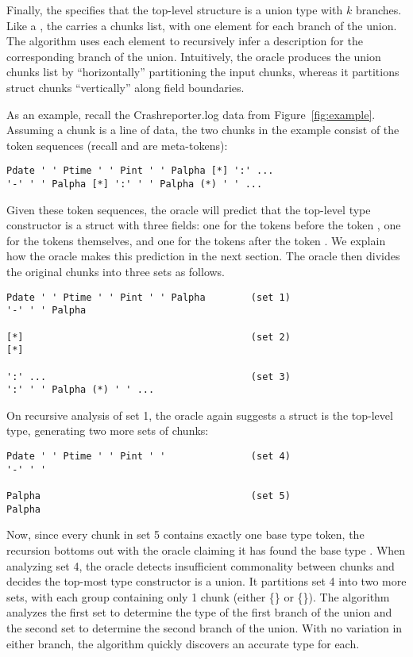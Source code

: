Finally, the  specifies that the top-level structure
is a union type with $k$ branches.  Like a , the
 carries a chunks list, with one element for each
branch of the union.  The algorithm uses each element to recursively
infer a description for the corresponding branch of the union. 
Intuitively, the oracle produces the union chunks list by ``horizontally''
partitioning the input chunks, whereas it partitions struct chunks
``vertically'' along field boundaries. 

As an example, recall the Crashreporter.log data from
Figure~\ref{fig:example}.  Assuming a chunk is a line of data, the two
chunks in the example consist of the token sequences
(recall \cd{[*]} and \cd{(*)} are meta-tokens):

{\small
\begin{verbatim}
Pdate ' ' Ptime ' ' Pint ' ' Palpha [*] ':' ...
'-' ' ' Palpha [*] ':' ' ' Palpha (*) ' ' ...
\end{verbatim}
}%

\noindent
Given these token sequences, 
the oracle will predict that the top-level type constructor is a struct 
with three fields: one for the tokens before the token \cd{[*]}, one
for the \cd{[*]} tokens themselves, and one for the tokens after the token
\cd{[*]}. We explain how the oracle makes this prediction in the next
section. The oracle then divides the original chunks into three sets
as follows. 

{\small
\begin{verbatim}
Pdate ' ' Ptime ' ' Pint ' ' Palpha        (set 1)       
'-' ' ' Palpha 

[*]                                        (set 2)       
[*]

':' ...                                    (set 3)       
':' ' ' Palpha (*) ' ' ...
\end{verbatim}
}%

\noindent
On recursive analysis of set 1, the oracle again suggests a struct is the top-level type,
generating two more sets of chunks: 

{\small
\begin{verbatim}
Pdate ' ' Ptime ' ' Pint ' '               (set 4)       
'-' ' '

Palpha                                     (set 5)       
Palpha 
\end{verbatim}
}%

\noindent
Now, since every chunk in set 5 contains exactly one base type
token, the recursion bottoms out with the oracle claiming it has
found the base type .  When analyzing set 4, 
the oracle detects insufficient commonality between chunks and decides
the top-most type constructor is a union. It partitions set 4 into
two more sets, with each group containing only 1 chunk (either
\{\} or \{\}).  The algorithm analyzes
the first set to determine the type of the first branch of the union
and the second set to determine the second branch of the union.
With no variation in either branch, the algorithm quickly discovers an
accurate type for each. 

